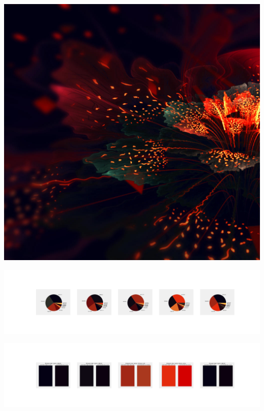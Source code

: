 \documentclass[11pt]{article}
\begin{document}
\begin{landscape}
    \begin{center}
    \includegraphics[width=\textwidth]{./nbimg/file (272).jpg}
    \end{center}

    \begin{center}
    \includegraphics[width=250mm]{./nbimg/pie-192.jpg}
    \end{center}

    \begin{center}
    \includegraphics[width=250mm]{./nbimg/peak-192.jpg}
    \end{center}
    


\end{landscape}
\end{document}
